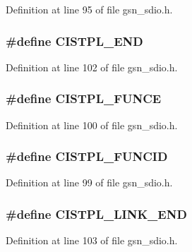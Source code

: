 Definition at line 95 of file gsn\_\-sdio.h.

\hypertarget{a00584_ab55b15a6e3e612bbf7acf72c959acf83}{
\subsubsection[{CISTPL\_\-END}]{\setlength{\rightskip}{0pt plus 5cm}\#define CISTPL\_\-END}}
\label{a00584_ab55b15a6e3e612bbf7acf72c959acf83}


Definition at line 102 of file gsn\_\-sdio.h.

\hypertarget{a00584_a99af349641e81e3aadae8c3d734bb411}{
\subsubsection[{CISTPL\_\-FUNCE}]{\setlength{\rightskip}{0pt plus 5cm}\#define CISTPL\_\-FUNCE}}
\label{a00584_a99af349641e81e3aadae8c3d734bb411}


Definition at line 100 of file gsn\_\-sdio.h.

\hypertarget{a00584_ac0f38d2fc8e1f138fa9c6710d7bd47ae}{
\subsubsection[{CISTPL\_\-FUNCID}]{\setlength{\rightskip}{0pt plus 5cm}\#define CISTPL\_\-FUNCID}}
\label{a00584_ac0f38d2fc8e1f138fa9c6710d7bd47ae}


Definition at line 99 of file gsn\_\-sdio.h.

\hypertarget{a00584_ab41c85f42d0e978901276a66d07d1312}{
\subsubsection[{CISTPL\_\-LINK\_\-END}]{\setlength{\rightskip}{0pt plus 5cm}\#define CISTPL\_\-LINK\_\-END}}
\label{a00584_ab41c85f42d0e978901276a66d07d1312}


Definition at line 103 of file gsn\_\-sdio.h.

